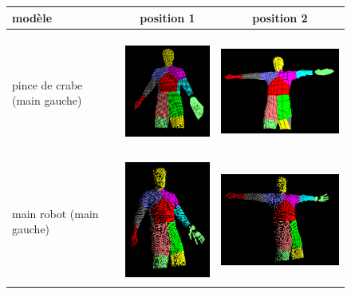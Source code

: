 \begin{figure}[!ht]
  \begin{center}
    \begin{tabular}{C{2cm}|c|c}
      modèle & position 1 & position 2 \\
      \hline
      pince de crabe (main gauche) & \includegraphics[height=4cm]{image/crabPlier1.PNG} & \includegraphics[height=4cm]{image/crabPlier2.PNG} \\
      \hline
      main robot (main gauche) & \includegraphics[height=4cm]{image/cyberHand1.PNG} & \includegraphics[height=4cm]{image/cyberHand2.PNG} \\
      \hline

\end{tabular}
\end{center}
\end{figure}
